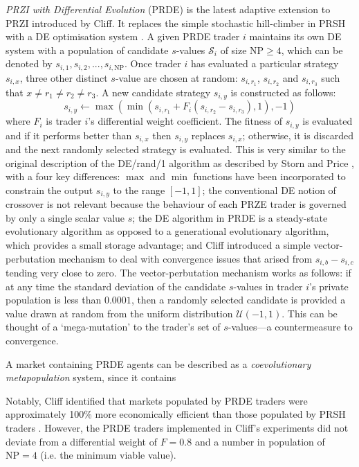\documentclass[conference]{IEEEtran}
\begin{document}
\textit{PRZI with Differential Evolution} (PRDE) \cite{PRDE} is the latest adaptive extension to PRZI introduced by Cliff.
It replaces the simple stochastic hill-climber in PRSH with a DE optimisation system \cite{StornPrice}.
A given PRDE trader $i$ maintains its own DE system with a population of candidate $s$-values $\mathcal{S}_i$ of size $\mathrm{NP}\ge4$, which can be denoted by $s_{i,1},s_{i,2},...,s_{i,\mathrm{NP}}$.
Once trader $i$ has evaluated a particular strategy $s_{i,x}$, three other distinct $s$-value are chosen at random: $s_{i,r_1}$, $s_{i,r_2}$ and $s_{i,r_3}$ such that $x\ne r_1\ne r_2\ne r_3$.
A new candidate strategy $s_{i,y}$ is constructed as follows:
\[
s_{i,y}\leftarrow\max(\min(s_{i,r_1}+F_i(s_{i,r_2}-s_{i,r_3}),1), -1)
\]
where $F_i$ is trader $i$'s differential weight coefficient.
The fitness of $s_{i,y}$ is evaluated and if it performs better than $s_{i,x}$ then $s_{i,y}$ replaces $s_{i,x}$; otherwise, it is discarded and the next randomly selected strategy is evaluated.
This is very similar to the original description of the DE/rand/1 algorithm as described by Storn and Price \cite{StornPrice}, with a four key differences: $\max$ and $\min$ functions have been incorporated to constrain the output $s_{i,y}$ to the range $[-1,1]$; the conventional DE notion of crossover is not relevant because the behaviour of each PRZE trader is governed by only a single scalar value $s$; the DE algorithm in PRDE is a steady-state evolutionary algorithm as opposed to a generational evolutionary algorithm, which provides a small storage advantage; and Cliff introduced a simple vector-perbutation mechanism to deal with convergence issues that arised from $s_{i,b}-s_{i,c}$ tending very close to zero.
The vector-perbutation mechanism works as follows: if at any time the standard deviation of the candidate $s$-values in trader $i$'s private population is less than $0.0001$, then a randomly selected candidate is provided a value drawn at random from the uniform distribution $\mathcal{U}(-1,1)$.
This can be thought of a `mega-mutation' to the trader's set of $s$-values---a countermeasure to convergence.

A market containing PRDE agents can be described as a \textit{coevolutionary} \textit{metapopulation} system, since it contains 


Notably, Cliff identified that markets populated by PRDE traders were approximately 100\% more economically efficient than those populated by PRSH traders \cite{PRDE}.
However, the PRDE traders implemented in Cliff's experiments did not deviate from a differential weight of $F=0.8$ and a number in population of $\mathrm{NP}=4$ (i.e. the minimum viable value).
\end{document}
